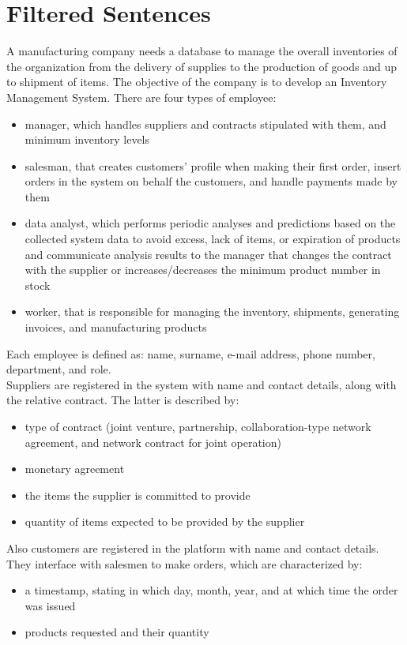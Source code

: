 \section{Filtered Sentences}

A manufacturing company needs a database to manage the overall inventories of the organization from the delivery of supplies to the production of goods and up to shipment of items. The objective of the company is to develop an Inventory Management System.
There are four types of employee:
\begin{itemize}
	\item manager, which handles suppliers and contracts stipulated with them, and minimum inventory levels
	\item salesman, that creates customers' profile when making their first order, insert orders in the system on behalf the customers, and handle payments made by them
	\item data analyst, which performs periodic analyses and predictions based on the collected system data to avoid excess, lack of items, or expiration of products and communicate analysis results to the manager that changes the contract with the supplier or increases/decreases the minimum product number in stock
	\item worker, that is responsible for managing the inventory, shipments, generating invoices, and manufacturing products
\end{itemize}
Each employee is defined as: name, surname, e-mail address, phone number, department, and role.\\
Suppliers are registered in the system with name and contact details, along with the relative contract. The latter is described by:
\begin{itemize}
	\item type of contract (joint venture, partnership, collaboration-type network agreement, and network contract for joint operation)
	\item monetary agreement
	\item the items the supplier is committed to provide
	\item quantity of items expected to be provided by the supplier
\end{itemize}
Also customers are registered in the platform with name and contact details. They interface with salesmen to make orders, which are characterized by:
\begin{itemize}
	\item a timestamp, stating in which day, month, year, and at which time the order was issued
	\item products requested and their quantity
\end{itemize}
